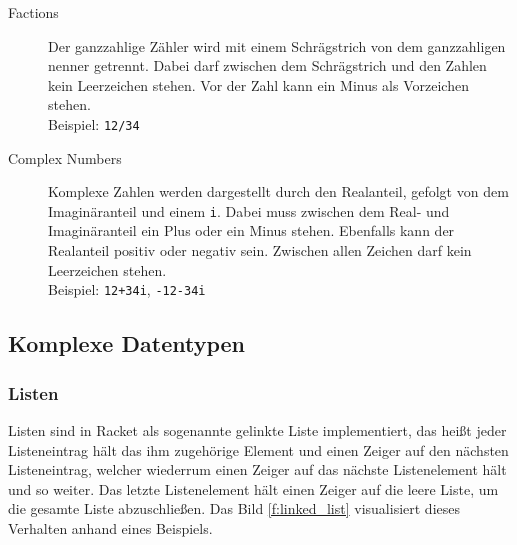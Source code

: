 \documentclass[a4paper, 11pt, accentcolor = tud3b]{tudreport}
\begin{document}
\begin{description}
\begin{description}
                            \item[Factions] Der ganzzahlige Zähler wird mit einem Schrägstrich von dem ganzzahligen nenner getrennt. Dabei darf zwischen dem Schrägstrich und den Zahlen kein Leerzeichen stehen. Vor der Zahl kann ein Minus als Vorzeichen stehen. \\ Beispiel: \texttt{12/34}
                            \item[Complex Numbers] Komplexe Zahlen werden dargestellt durch den Realanteil, gefolgt von dem Imaginäranteil und einem \texttt{i}. Dabei muss zwischen dem Real- und Imaginäranteil ein Plus oder ein Minus stehen. Ebenfalls kann der Realanteil positiv oder negativ sein. Zwischen allen Zeichen darf kein Leerzeichen stehen. \\ Beispiel: \texttt{12+34i}, \texttt{-12-34i}
                        \end{description}
                \end{description}



        \subsection{Komplexe Datentypen}
            \subsubsection{Listen}
                Listen sind in Racket als sogenannte gelinkte Liste implementiert, das heißt jeder Listeneintrag hält das ihm zugehörige Element und einen Zeiger auf den nächsten Listeneintrag, welcher wiederrum einen Zeiger auf das nächste Listenelement hält und so weiter. Das letzte Listenelement hält einen Zeiger auf die leere Liste, um die gesamte Liste abzuschließen. Das Bild \ref{f:linked_list} visualisiert dieses Verhalten anhand eines Beispiels.
\end{document}
